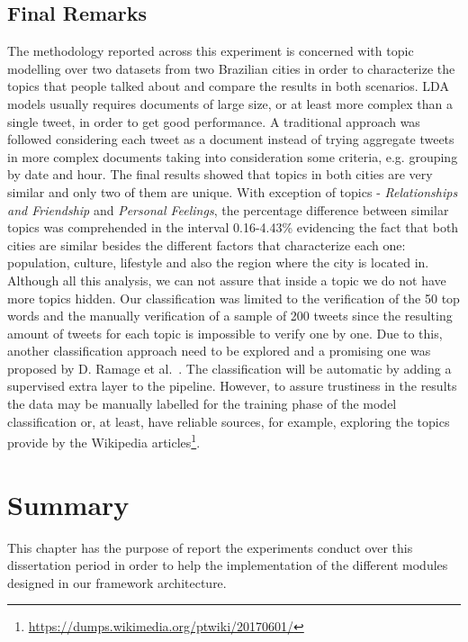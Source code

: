 \subsection{Final Remarks}
The methodology reported across this experiment is concerned with topic modelling over two datasets from two Brazilian cities in order to characterize the topics that people talked about and compare the results in both scenarios. LDA models usually requires documents of large size, or at least more complex than a single tweet, in order to get good performance. A traditional approach was followed considering each tweet as a document instead of trying aggregate tweets in more complex documents taking into consideration some criteria, e.g. grouping by date and hour. The final results showed that topics in both cities are very similar and only two of them are unique. With exception of topics - \textit{Relationships and Friendship} and \textit{Personal Feelings}, the percentage difference between similar topics was comprehended in the interval 0.16-4.43\% evidencing the fact that both cities are similar besides the different factors that characterize each one: population, culture, lifestyle and also the region where the city is located in. Although all this analysis, we can not assure that inside a topic we do not have more topics hidden. Our classification was limited to the verification of the 50 top words and the manually verification of a sample of 200 tweets since the resulting amount of tweets for each topic is impossible to verify one by one. Due to this, another classification approach need to be explored and a promising one was proposed by D. Ramage et al.~\cite{ramage2010characterizing}. The classification will be automatic by adding a supervised extra layer to the pipeline. However, to assure trustiness in the results the data may be manually labelled for the training phase of the model classification or, at least, have reliable sources, for example, exploring the topics provide by the Wikipedia articles\footnote{\url{https://dumps.wikimedia.org/ptwiki/20170601/}}.


\section{Summary}
This chapter has the purpose of report the experiments conduct over this dissertation period in order to help the implementation of the different modules designed in our framework architecture.

